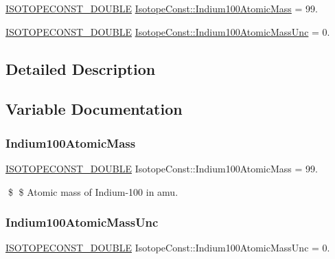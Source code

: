 \begin{DoxyCompactItemize}
\item 
\mbox{\hyperlink{group___isotope_const-_macros_ga8f45a7272ce02c0b4c65c44636ed719a}{I\+S\+O\+T\+O\+P\+E\+C\+O\+N\+S\+T\+\_\+\+D\+O\+U\+B\+LE}} \mbox{\hyperlink{group___isotope_const-_indium-_in100_ga9ec042331af1e97ed0746864d168bd42}{Isotope\+Const\+::\+Indium100\+Atomic\+Mass}} = 99.
\item 
\mbox{\hyperlink{group___isotope_const-_macros_ga8f45a7272ce02c0b4c65c44636ed719a}{I\+S\+O\+T\+O\+P\+E\+C\+O\+N\+S\+T\+\_\+\+D\+O\+U\+B\+LE}} \mbox{\hyperlink{group___isotope_const-_indium-_in100_gab42b4b8148ee352c101984b520d2d242}{Isotope\+Const\+::\+Indium100\+Atomic\+Mass\+Unc}} = 0.
\end{DoxyCompactItemize}


\subsection{Detailed Description}


\subsection{Variable Documentation}
\mbox{\label{group___isotope_const-_indium-_in100_ga9ec042331af1e97ed0746864d168bd42}} 
\subsubsection{\texorpdfstring{Indium100\+Atomic\+Mass}{Indium100AtomicMass}}
{\footnotesize\ttfamily \mbox{\hyperlink{group___isotope_const-_macros_ga8f45a7272ce02c0b4c65c44636ed719a}{I\+S\+O\+T\+O\+P\+E\+C\+O\+N\+S\+T\+\_\+\+D\+O\+U\+B\+LE}} Isotope\+Const\+::\+Indium100\+Atomic\+Mass = 99.}

\$ \$ Atomic mass of Indium-\/100 in amu. \mbox{\label{group___isotope_const-_indium-_in100_gab42b4b8148ee352c101984b520d2d242}} 
\subsubsection{\texorpdfstring{Indium100\+Atomic\+Mass\+Unc}{Indium100AtomicMassUnc}}
{\footnotesize\ttfamily \mbox{\hyperlink{group___isotope_const-_macros_ga8f45a7272ce02c0b4c65c44636ed719a}{I\+S\+O\+T\+O\+P\+E\+C\+O\+N\+S\+T\+\_\+\+D\+O\+U\+B\+LE}} Isotope\+Const\+::\+Indium100\+Atomic\+Mass\+Unc = 0.}

